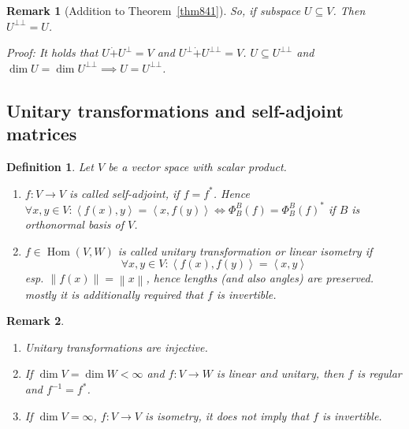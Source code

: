 \documentclass{article}
\newtheorem{definition}{Definition}  \numberwithin{definition}{section}
\newtheorem{remark}{Remark}  \numberwithin{remark}{section}
\newcommand{\ip}[2]{\left\langle#1,#2\right\rangle} %
\newcommand{\norm}[1]{\left\|#1\right\|}
\DeclareMathOperator{\Hom}{Hom}
\begin{document}
\begin{remark}[Addition to Theorem~\ref{thm841}]
  So, if subspace $U \subseteq V$. Then $U^{\bot\bot} = U$.

  Proof: It holds that $U \dot{+} U^\bot = V$ and $U^\bot \dot{+} U^{\bot\bot} = V$.
  $U \subseteq U^{\bot\bot}$ and $\dim{U} = \dim{U}^{\bot\bot} \implies U = U^{\bot\bot}$.
\end{remark}

\subsection{Unitary transformations and self-adjoint matrices}
\begin{definition} %
  Let $V$ be a vector space with scalar product.
  \begin{enumerate}
    \item $f: V \to V$ is called \emph{self-adjoint}, if $f = f^*$.
      Hence $\forall x, y \in V: \ip{f(x)}{y} = \ip{x}{f(y)} \iff \Phi_B^B(f) = \Phi_B^B(f)^*$
      if $B$ is orthonormal basis of $V$.
    \item
      $f \in \Hom(V,W)$ is called \emph{unitary transformation} or \emph{linear isometry} if
      \[ \forall x,y \in V: \ip{f(x)}{f(y)} = \ip{x}{y} \]
      esp. $\norm{f(x)} = \norm{x}$, hence lengths (and also angles) are preserved. \\
      \emph{mostly} it is additionally required that $f$ is invertible.
  \end{enumerate}
\end{definition}

\begin{remark} %
  \label{bem868}
  \begin{enumerate}
    \item Unitary transformations are injective.
    \item If $\dim{V} = \dim{W} < \infty$ and $f: V \to W$ is linear and unitary,
    then $f$ is regular and $f^{-1} = f^*$.
    \item If $\dim{V} = \infty$, $f: V \to V$ is isometry, it does not imply that $f$ is invertible.
  \end{enumerate}
\end{remark}
\end{document}
